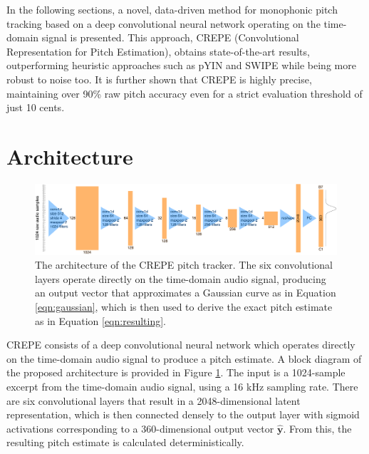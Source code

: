 In the following sections, a novel, data-driven method for monophonic pitch tracking based on a deep convolutional neural network operating on the time-domain signal is presented.
This approach, CREPE (Convolutional  Representation  for  Pitch  Estimation), obtains state-of-the-art results, outperforming heuristic approaches such as pYIN and SWIPE while being more robust to noise too.
It is further shown that CREPE is highly precise, maintaining over 90\% raw pitch accuracy even for a strict evaluation threshold of just 10 cents.

\section{Architecture}

\begin{figure}
	\includegraphics[width=\textwidth]{architecture.pdf}
	\caption{The architecture of the CREPE pitch tracker. The six convolutional layers operate directly on the time-domain audio signal, producing an output vector that approximates a Gaussian curve as in Equation \ref{eqn:gaussian}, which is then used to derive the exact pitch estimate as in Equation \ref{eqn:resulting}.}
	\label{fig:architecture}
\end{figure}

CREPE consists of a deep convolutional neural network which operates directly on the time-domain audio signal to produce a pitch estimate.
A block diagram of the proposed architecture is provided in Figure \ref{fig:architecture}.
The input is a 1024-sample excerpt from the time-domain audio signal, using a 16 kHz sampling rate.
There are six convolutional layers that result in a 2048-dimensional latent representation, which is then connected densely to the output layer with sigmoid activations corresponding to a 360-dimensional output vector $\hat{\mathbf{y}}$.
From this, the resulting pitch estimate is calculated deterministically.

